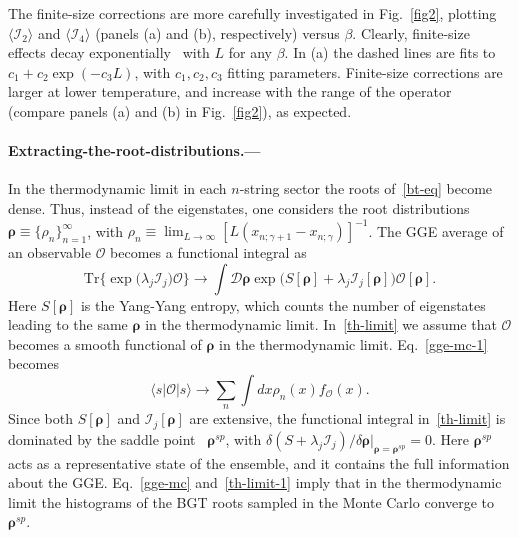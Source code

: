 \documentclass[twocolumn,superscriptaddress,prb,10pt]{revtex4-1}
\begin{document}

The finite-size corrections are more carefully investigated in Fig.~\ref{fig2},   
plotting $\langle{\mathcal I}_2\rangle$ and $\langle {\mathcal I}_4
\rangle$ (panels (a) and (b), respectively) versus $\beta$. Clearly,  
finite-size effects decay exponentially~\cite{iyer-2015} with $L$ for any $\beta$. In (a) the dashed 
lines are fits to $c_1+c_2\exp(-c_3L)$, with $c_1,c_2,c_3$ fitting parameters. 
Finite-size  corrections are larger at lower temperature, and increase with the 
range of the operator (compare panels  (a) and (b) in Fig.~\ref{fig2}), as expected. 

\paragraph*{Extracting-the-root-distributions.---}

In the thermodynamic limit in each $n$-string sector the roots of~\eqref{bt-eq} become 
dense. Thus, instead of the eigenstates, one considers the root 
distributions $\pmb{\rho}\equiv\{\rho_n\}_{n=1}^\infty$, with $\rho_n\equiv
\lim_{L\to\infty}[L(x_{n;\gamma+1}-x_{n;\gamma})]^{-1}$. The GGE average of an
observable ${\mathcal O}$ becomes a functional integral as~\cite{yang-1969,mossel-2012} 
%
\begin{equation}
\label{th-limit}
\textrm{Tr}\big\{\exp\big({\lambda_j{\mathcal I}_j}\big){\mathcal O}\big\}
\rightarrow\int{\mathcal D}\pmb{\rho}\exp\big(S[\pmb{\rho}]+
\lambda_j{\mathcal I}_j[\pmb{\rho}]\big){\mathcal O}[\pmb{\rho}].
\end{equation}
%
Here $S[\pmb{\rho}]$ is the Yang-Yang entropy, which counts the number of eigenstates 
leading to the same $\pmb{\rho}$ in the thermodynamic limit. 
In~\eqref{th-limit} we assume that ${\mathcal O}$ becomes a smooth functional 
of $\pmb{\rho}$ in the thermodynamic limit. Eq.~\eqref{gge-mc-1} becomes 
%
\begin{equation}
\label{th-limit-1}
\langle s|{\mathcal O}|s\rangle\to\sum\limits_{n}\int dx\rho_n(x)f_{{\mathcal O}}(x).
\end{equation}
%
Since both $S[\pmb{\rho}]$ and ${\mathcal I}_j[\pmb{\rho}]$ are extensive, the functional 
integral in~\eqref{th-limit} is dominated by the saddle point~\cite{mossel-2012} 
$\pmb{\rho}^{sp}$, with $\delta(S+\lambda_j{\mathcal I}_j)/\delta\pmb{\rho}|_{\pmb{\rho}=
\pmb{\rho}^{sp}}=0$. Here $\pmb{\rho}^{sp}$ acts as a representative 
state of the ensemble, and it contains the full information about the GGE. 
Eq.~\eqref{gge-mc} and~\eqref{th-limit-1} imply that in the thermodynamic limit 
the histograms of the BGT roots sampled in the Monte Carlo converge to $\pmb{\rho}^{sp}$.  
\end{document}
